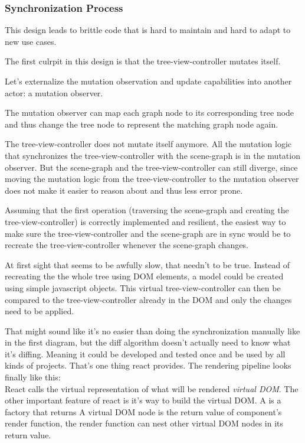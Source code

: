 \subsubsection{Synchronization Process}
\label{synchronization-process}

This design leads to brittle code that is hard to maintain and hard to
adapt to new use cases.

The first culrpit in this design is that the tree-view-controller
mutates itself.

Let's externalize the mutation observation and update capabilities into
another actor: a mutation observer.

The mutation observer can map each graph node to its corresponding tree
node and thus change the tree node to represent the matching graph node
again.

The tree-view-controller does not mutate itself anymore. All the
mutation logic that synchronizes the tree-view-controller with the
scene-graph is in the mutation observer. But the scene-graph and the
tree-view-controller can still diverge, since moving the mutation logic
from the tree-view-controller to the mutation observer does not make it
easier to reason about and thus less error prone.

Assuming that the first operation (traversing the scene-graph and
creating the tree-view-controller) is correctly implemented and
resilient, the easiest way to make sure the tree-view-controller and the
scene-graph are in sync would be to recreate the tree-view-controller
whenever the scene-graph changes.

At first sight that seems to be awfully slow, that needn't to be true.
Instead of recreating the the whole tree using DOM elements, a
model could be created using simple javascript objects. This virtual
tree-view-controller can then be compared to the tree-view-controller
already in the DOM and only the changes need to be applied.

That might sound like it's no easier than doing the synchronization
manually like in the first diagram, but the diff algorithm doesn't
actually need to know what it's diffing. Meaning it could be developed
and tested once and be used by all kinds of projects. That's one thing
react provides. The rendering pipeline looks finally like this:\\

React calls the virtual representation of what will be rendered
\emph{virtual DOM}. The other important feature of react is it's way to
build the virtual DOM. A is a factory that returns A virtual DOM node is
the return value of component's render function, the render function can
nest other virtual DOM nodes in its return value.

